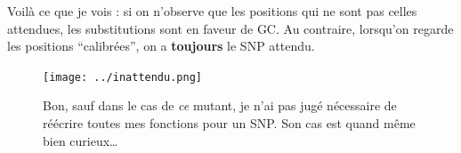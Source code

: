 \documentclass[a4paper]{tufte-handout}
\begin{document}
Voilà ce que je vois : si on n'observe que les positions qui ne sont pas celles
attendues, les substitutions sont en faveur de GC. Au contraire, lorsqu'on
regarde les positions ``calibrées'', on a \textbf{toujours} le SNP attendu. 
\begin{center}
  {\sffamily }
\end{center}

\begin{figure}
  \texttt{[image: ../inattendu.png]}
  \caption{Bon, sauf dans le cas de {\em ce} mutant, je n'ai pas jugé nécessaire
    de réécrire toutes mes fonctions pour un SNP. Son cas est quand même bien
    curieux…}
\end{figure}
\end{document}
